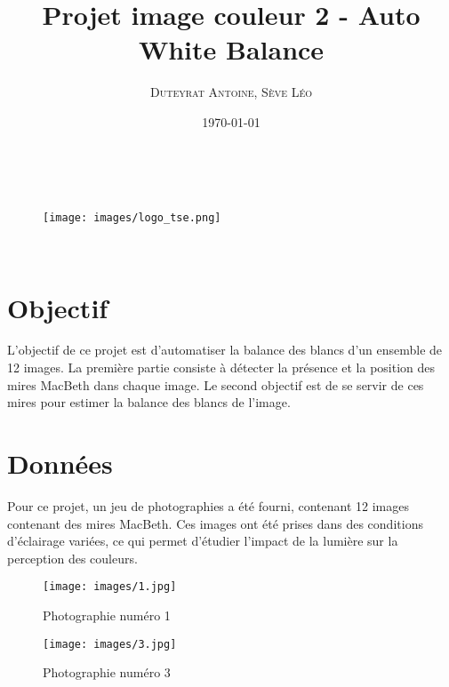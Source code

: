 \documentclass[12pt]{article}
\title{\textbf{Projet image couleur 2 - Auto White Balance}}
\author{
    \textsc{Duteyrat Antoine},
    \textsc{Sève Léo}
}
\date{\today}
\makeatletter
\let\titre\@title %
\let\auteurs\@author %
\let\date\@date %
\makeatother
\begin{document}
\begin{titlepage}
    \begin{center}
        \vskip 1.5cm
        {\color {couleur}{\huge \bf \titre}}\\[5mm] %
        \vskip 0.5cm
        \begin{figure}[h]
        \centering
        \texttt{[image: images/logo\_tse.png]}
        \end{figure}
        \vskip 1cm %
        {\large \auteurs}\\ %
        \vskip 0.5cm %
        \vfill
        \vskip 0.2cm
        \date %
      \end{center}
\end{titlepage}
\clearpage

\tableofcontents

\newpage

\section{Objectif}

L'objectif de ce projet est d'automatiser la balance des blancs d'un ensemble de 12 images.
La première partie consiste à détecter la présence et la position des mires MacBeth dans chaque image.
Le second objectif est de se servir de ces mires pour estimer la balance des blancs de l'image.

\section{Données}

Pour ce projet, un jeu de photographies a été fourni, contenant 12 images contenant des mires MacBeth. Ces images ont été prises dans des conditions d'éclairage variées, ce qui permet d'étudier l'impact de la lumière sur la perception des couleurs.

\begin{figure}[H]
    \centering
    \texttt{[image: images/1.jpg]}
    \caption{Photographie numéro 1}
\end{figure}

\begin{figure}[H]
    \centering
    \texttt{[image: images/3.jpg]}
    \caption{Photographie numéro 3}
\end{figure}
\end{document}
